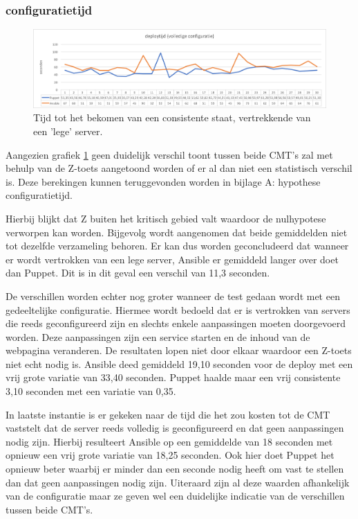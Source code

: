 \subsubsection{\gls{configuratietijd}}
\begin{figure}
  \includegraphics[width=\linewidth]{img/deploytime_fullconfig.png} 
  \caption{Tijd tot het bekomen van een consistente staat, vertrekkende van een 'lege' server.}  
  \label{fig:deploytime_fullconfig}
\end{figure}

Aangezien grafiek \ref{fig:deploytime_fullconfig} geen duidelijk verschil toont tussen beide \gls{CMT}'s zal met behulp van de Z-toets aangetoond worden of er al dan niet een statistisch verschil is. Deze berekingen kunnen teruggevonden worden in bijlage A: hypothese configuratietijd.

Hierbij blijkt dat Z buiten het kritisch gebied valt waardoor de nulhypotese verworpen kan worden. Bijgevolg wordt aangenomen dat beide gemiddelden niet tot dezelfde verzameling behoren. Er kan dus worden geconcludeerd dat wanneer er wordt vertrokken van een lege server, Ansible er gemiddeld langer over doet dan Puppet. Dit is in dit geval een verschil van 11,3 seconden. 

De verschillen worden echter nog groter wanneer de test gedaan wordt met een gedeeltelijke configuratie. Hiermee wordt bedoeld dat er is vertrokken van servers die reeds geconfigureerd zijn en slechts enkele aanpassingen moeten doorgevoerd worden. Deze aanpassingen zijn een service starten en de inhoud van de webpagina veranderen. De resultaten lopen niet door elkaar waardoor een Z-toets niet echt nodig is. Ansible deed gemiddeld 19,10 seconden voor de deploy met een vrij grote variatie van 33,40 seconden. Puppet haalde maar een vrij consistente 3,10 seconden met een variatie van 0,35. \newline

In laatste instantie is er gekeken naar de tijd die het zou kosten tot de \gls{CMT} vaststelt dat de server reeds volledig is geconfigureerd en dat geen aanpassingen nodig zijn. Hierbij resulteert Ansible op een gemiddelde van 18 seconden met opnieuw een vrij grote variatie van 18,25 seconden. Ook hier doet Puppet het opnieuw beter waarbij er minder dan een seconde nodig heeft om vast te stellen dan dat geen aanpassingen nodig zijn. Uiteraard zijn al deze waarden afhankelijk van de configuratie maar ze geven wel een duidelijke indicatie van de verschillen tussen beide \gls{CMT}'s.

